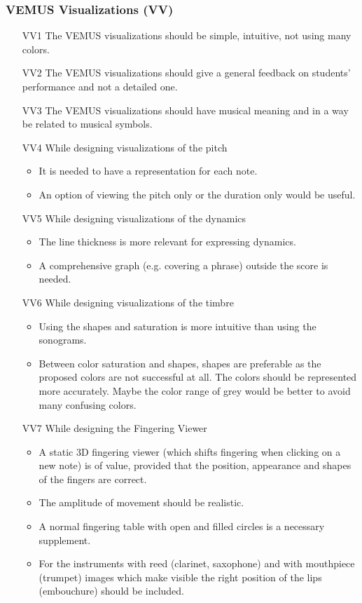 \subsubsection{VEMUS Visualizations (VV)}
\begin{itemize} \itemsep0em
\item[VV1] The VEMUS visualizations should be simple, intuitive, not using many colors.
\item[VV2] The VEMUS visualizations should give a general feedback on students' performance and not a detailed one.
\item[VV3] The VEMUS visualizations should have musical meaning and in a way be related to musical symbols.
\item[VV4] While designing visualizations of the pitch\begin{itemize} \itemsep0em
\item It is needed to have a representation for each note.
\item An option of viewing the pitch only or the duration only would be useful.
\end{itemize}

\item[VV5] While designing visualizations of the dynamics\begin{itemize} \itemsep0em
\item The line thickness is more relevant for expressing dynamics.
\item A comprehensive graph (e.g. covering a phrase) outside the score is needed.
\end{itemize}

\item[VV6] While designing visualizations of the timbre\begin{itemize} \itemsep0em
\item Using the shapes and saturation is more intuitive than using the sonograms.
\item Between color saturation and shapes, shapes are preferable as the proposed colors are not successful at all. The colors should be represented more accurately. Maybe the color range of grey would be better to avoid many confusing colors.
\end{itemize}

\item[VV7] While designing the Fingering Viewer\begin{itemize} \itemsep0em
\item A static 3D fingering viewer (which shifts fingering when clicking on a new note) is of value, provided that the position, appearance and shapes of the fingers are correct.
\item The amplitude of movement should be realistic.
\item A normal fingering table with open and filled circles is a necessary supplement.
\item For the instruments with reed (clarinet, saxophone) and with mouthpiece (trumpet) images which make visible the right position of the lips (embouchure) should be included.
\end{itemize}


\end{itemize}
